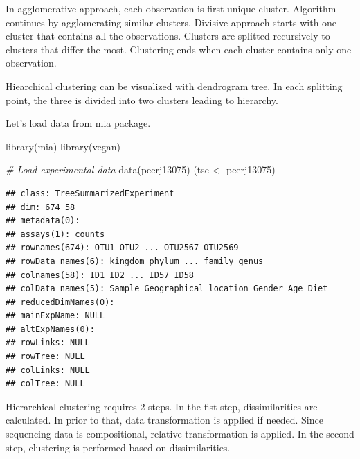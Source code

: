 \documentclass[
]{book}
\newenvironment{Shaded}{\begin{snugshade}}{\end{snugshade}}
\newcommand{\CommentTok}[1]{\textcolor[rgb]{0.56,0.35,0.01}{\textit{#1}}}
\newcommand{\FunctionTok}[1]{\textcolor[rgb]{0.00,0.00,0.00}{#1}}
\newcommand{\NormalTok}[1]{#1}
\newcommand{\OtherTok}[1]{\textcolor[rgb]{0.56,0.35,0.01}{#1}}
\begin{document}
In agglomerative approach, each observation is first unique cluster.
Algorithm continues by agglomerating similar clusters. Divisive
approach starts with one cluster that contains all the
observations. Clusters are splitted recursively to clusters that
differ the most. Clustering ends when each cluster contains only one
observation.

Hiearchical clustering can be visualized with dendrogram tree. In each
splitting point, the three is divided into two clusters leading to
hierarchy.

Let's load data from mia package.

\begin{Shaded}
\begin{Highlighting}[]
\FunctionTok{library}\NormalTok{(mia)}
\FunctionTok{library}\NormalTok{(vegan)}

\CommentTok{\# Load experimental data}
\FunctionTok{data}\NormalTok{(peerj13075)}
\NormalTok{(tse }\OtherTok{\textless{}{-}}\NormalTok{ peerj13075)}
\end{Highlighting}
\end{Shaded}

\begin{verbatim}
## class: TreeSummarizedExperiment 
## dim: 674 58 
## metadata(0):
## assays(1): counts
## rownames(674): OTU1 OTU2 ... OTU2567 OTU2569
## rowData names(6): kingdom phylum ... family genus
## colnames(58): ID1 ID2 ... ID57 ID58
## colData names(5): Sample Geographical_location Gender Age Diet
## reducedDimNames(0):
## mainExpName: NULL
## altExpNames(0):
## rowLinks: NULL
## rowTree: NULL
## colLinks: NULL
## colTree: NULL
\end{verbatim}

Hierarchical clustering requires 2 steps. In the fist step, dissimilarities are
calculated. In prior to that, data transformation is applied if needed. Since
sequencing data is compositional, relative transformation is applied.
In the second step, clustering is performed based on dissimilarities.
\end{document}
